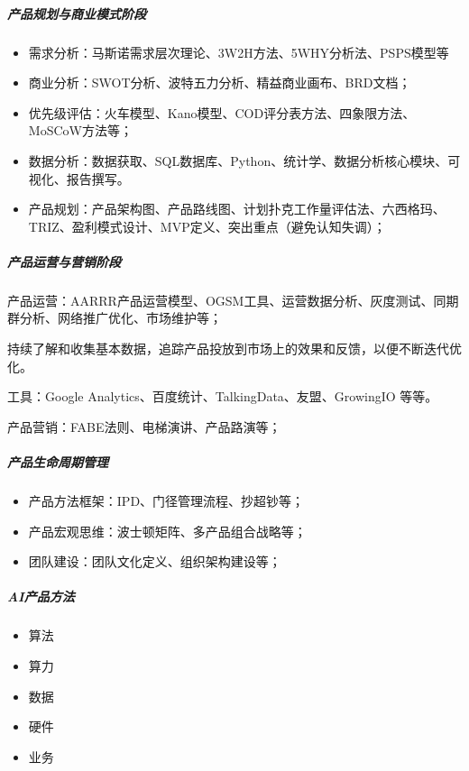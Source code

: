 \documentclass[letterpaper,10pt,english]{sphinxmanual}
\begin{document}
\subparagraph{产品规划与商业模式阶段}
\label{\detokenize{chapter_introduction/ability:id12}}\begin{itemize}
\item {} 
需求分析：马斯诺需求层次理论、3W2H方法、5WHY分析法、PSPS模型等

\item {} 
商业分析：SWOT分析、波特五力分析、精益商业画布、BRD文档；

\item {} 
优先级评估：火车模型、Kano模型、COD评分表方法、四象限方法、MoSCoW方法等；

\item {} 
数据分析：数据获取、SQL数据库、Python、统计学、数据分析核心模块、可视化、报告撰写。

\item {} 
产品规划：产品架构图、产品路线图、计划扑克工作量评估法、六西格玛、TRIZ、盈利模式设计、MVP定义、突出重点（避免认知失调）；

\end{itemize}


\subparagraph{产品运营与营销阶段}
\label{\detokenize{chapter_introduction/ability:id13}}
产品运营：AARRR产品运营模型、OGSM工具、运营数据分析、灰度测试、同期群分析、网络推广优化、市场维护等；

持续了解和收集基本数据，追踪产品投放到市场上的效果和反馈，以便不断迭代优化。
%
\begin{footnote}[345]\sphinxAtStartFootnote
{}
%
\end{footnote} 工具：Google
Analytics、百度统计、TalkingData、友盟、GrowingIO 等等。

产品营销：FABE法则、电梯演讲、产品路演等；


\subparagraph{产品生命周期管理}
\label{\detokenize{chapter_introduction/ability:id14}}\begin{itemize}
\item {} 
产品方法框架：IPD、门径管理流程、抄超钞等；

\item {} 
产品宏观思维：波士顿矩阵、多产品组合战略等；

\item {} 
团队建设：团队文化定义、组织架构建设等；

\end{itemize}


\subparagraph{AI产品方法}
\label{\detokenize{chapter_introduction/ability:ai}}\begin{itemize}
\item {} 
算法

\item {} 
算力

\item {} 
数据

\item {} 
硬件

\item {} 
业务

\end{itemize}
\end{document}
